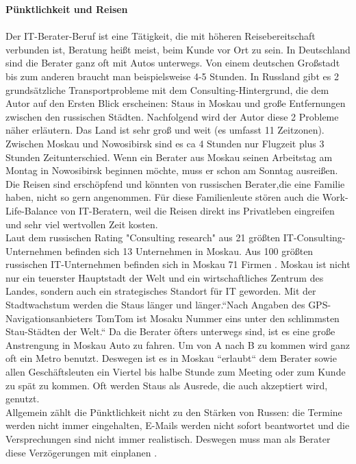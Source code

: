	 \textbf{Pünktlichkeit und Reisen }\\
	 \\
	 Der IT-Berater-Beruf ist eine Tätigkeit, die mit höheren Reisebereitschaft verbunden ist, Beratung heißt meist, beim Kunde vor Ort zu sein. In Deutschland sind die Berater ganz oft mit Autos unterwegs. Von einem deutschen Großstadt bis zum anderen braucht man beispielsweise 4-5 Stunden. In Russland gibt es 2 grundsätzliche Transportprobleme mit dem Consulting-Hintergrund, die dem Autor auf den Ersten Blick erscheinen: Staus in Moskau und große Entfernungen zwischen den russischen Städten. Nachfolgend wird der Autor diese 2 Probleme näher erläutern. Das Land ist sehr groß und weit (es umfasst 11 Zeitzonen).
	 Zwischen Moskau und Nowosibirsk sind es ca 4 Stunden nur Flugzeit plus 3 Stunden Zeitunterschied. Wenn ein Berater aus Moskau seinen Arbeitstag am Montag in Nowosibirsk beginnen möchte, muss er schon am Sonntag ausreißen. Die Reisen sind erschöpfend und könnten von russischen Berater,die eine Familie haben, nicht so gern angenommen. Für diese Familienleute stören auch die Work-Life-Balance von IT-Beratern, weil die Reisen direkt ins Privatleben eingreifen und sehr viel wertvollen Zeit kosten.\\
	 Laut dem russischen Rating "Consulting research" aus 21 größten IT-Consulting-Unternehmen befinden sich 13 Unternehmen in Moskau\cite{RaitConsRU}.
	 Aus 100 größten russischen IT-Unternehmen befinden sich in Moskau 71 Firmen \cite{100BigITConsURU}. 
	 Moskau ist nicht nur ein teuerster Hauptstadt der Welt und ein wirtschaftliches Zentrum des Landes, sondern auch ein strategisches Standort für IT geworden.
	 Mit der Stadtwachstum werden die Staus länger und länger.``Nach Angaben des GPS-Navigationsanbieters TomTom ist Mosaku Nummer eins unter den schlimmsten Stau-Städten der Welt\cite{MoskauStau1}.``
	 Da die Berater öfters unterwegs sind, ist es eine große Anstrengung in Moskau Auto zu fahren. Um von A nach B zu kommen wird ganz oft ein Metro benutzt. 
	 Deswegen ist es in Moskau ``erlaubt`` dem Berater sowie allen Geschäftsleuten ein Viertel bis halbe Stunde zum Meeting oder zum  Kunde zu spät zu kommen. Oft werden Staus als Ausrede, die auch akzeptiert wird, genutzt.\\
	 Allgemein zählt die Pünktlichkeit nicht zu den Stärken von Russen: die Termine werden nicht immer eingehalten, E-Mails werden nicht sofort beantwortet und die Versprechungen sind nicht immer realistisch. Deswegen muss man als Berater diese Verzögerungen mit einplanen \cite{RusKnigge}.\\ \\
